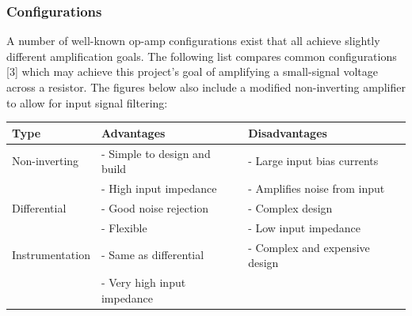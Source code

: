 \subsubsection{Configurations}\label{sec:opamps_configs}
A number of well-known op-amp configurations exist that all achieve slightly different amplification goals. The following list compares common configurations [3] which may achieve this project's goal
of amplifying a small-signal voltage across a resistor. The figures below also include a modified non-inverting amplifier to allow for input signal filtering:
\begin{center}

    \begin{tabular}{|p{3.5cm}|p{6cm}|p{6cm}|}
        \hline
        Type            & Advantages                                      & Disadvantages                               \\
        \hline
        Non-inverting   & - Simple to design and build                    & - Large input bias currents                 \\
                        & - High input impedance                          & - Amplifies noise from input                \\
        \hline
        Differential    & - Good noise rejection                          & - Complex design                            \\
                        & - Flexible                                      & - Low input impedance                       \\
        \hline
        Instrumentation & - Same as differential                          & - Complex and expensive design              \\
                        & - Very high input impedance                     &                                             \\
        \hline
    \end{tabular}
\end{center}

